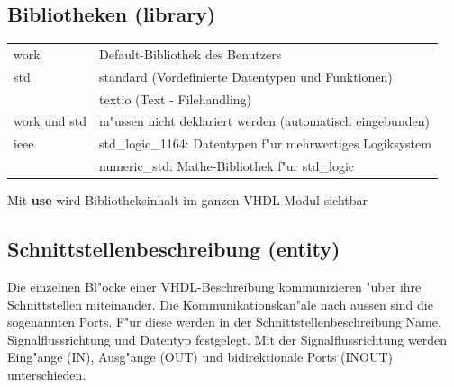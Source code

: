 	\subsection{Bibliotheken (library)}
		\begin{tabular}{ll}
			work & Default-Bibliothek des Benutzers \\
			std & standard (Vordefinierte Datentypen und Funktionen)\\
			& textio (Text -  Filehandling)\\
			work und std &m"ussen nicht deklariert werden (automatisch eingebunden)\\
			ieee & std\_logic\_1164: Datentypen f"ur mehrwertiges Logiksystem\\
			& numeric\_std: Mathe-Bibliothek f"ur std\_logic
		\end{tabular}
		\begin{multicols}{2}
			
		\end{multicols}
		 Mit \textbf{use} wird Bibliotheksinhalt im ganzen VHDL Modul sichtbar

	\subsection{Schnittstellenbeschreibung (entity)}
		Die einzelnen Bl"ocke einer VHDL-Beschreibung kommunizieren "uber ihre 
		Schnittstellen miteinander. Die Kommunikationskan"ale nach aussen sind die 
		sogenannten Ports. F"ur diese werden in der Schnittstellenbeschreibung Name, 		
		Signalflussrichtung und Datentyp festgelegt. Mit der Signalflussrichtung werden 
		Eing"ange (IN), Ausg"ange (OUT) und bidirektionale Ports (INOUT) unterschieden.
		\begin{multicols}{2}
			
			
		\end{multicols}

